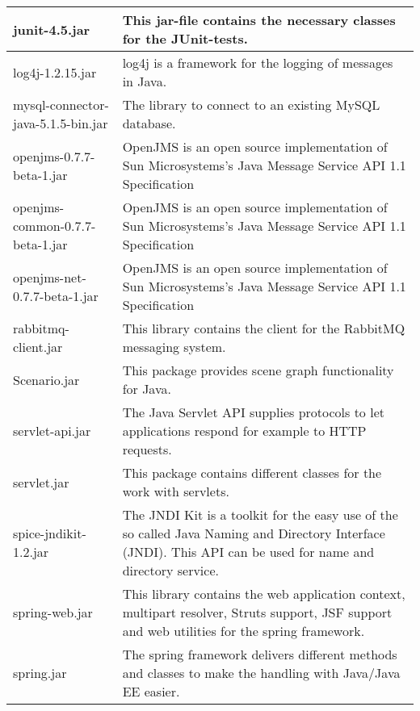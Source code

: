 \begin{center}
\begin{longtable}{|p{}|p{}|}
\hline 
junit-4.5.jar & This jar-file contains the necessary classes for the JUnit-tests.\\
\hline 
log4j-1.2.15.jar & log4j is a framework for the logging of messages in Java.\\
\hline 
mysql-connector-java-5.1.5-bin.jar & The library to connect to an existing MySQL database.\\
\hline 
openjms-0.7.7-beta-1.jar & OpenJMS is an open source implementation of Sun Microsystems's Java Message Service API 1.1 Specification\\
\hline 
openjms-common-0.7.7-beta-1.jar & OpenJMS is an open source implementation of Sun Microsystems's Java Message Service API 1.1 Specification\\
\hline 
openjms-net-0.7.7-beta-1.jar & OpenJMS is an open source implementation of Sun Microsystems's Java Message Service API 1.1 Specification\\
\hline 
rabbitmq-client.jar & This library contains the client for the RabbitMQ messaging system.\\
\hline 
Scenario.jar & This package provides scene graph functionality for Java.\\
\hline 
servlet-api.jar & The Java Servlet API supplies protocols to let applications respond for example to HTTP requests.\\
\hline 
servlet.jar & This package contains different classes for the work with servlets.\\
\hline 
spice-jndikit-1.2.jar & The JNDI Kit is a toolkit for the easy use of the so called Java Naming and Directory Interface (JNDI). This API can be used for name and directory service.\\
\hline 
spring-web.jar & This library contains the web application context, multipart resolver, Struts support, JSF support and web utilities for the spring framework.\\
\hline 
spring.jar & The spring framework delivers different methods and classes to make the handling with Java/Java EE easier.\\
\hline 
\end{longtable}
\label{tabular:libraries}
\end{center}
